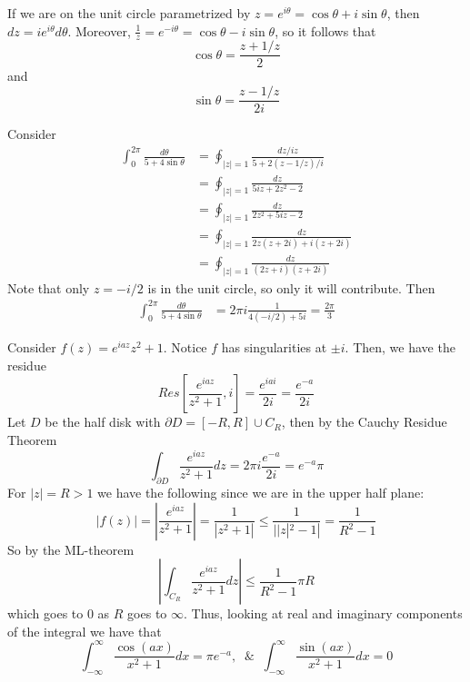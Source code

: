 \documentclass[12pt, a4paper, oneside, openright, titlepage]{book}
\begin{document}
If we are on the unit circle parametrized by $z=e^{i\theta}=\cos\theta + i\sin\theta$, then $dz = ie^{i\theta}d\theta$. Moreover, $\frac{1}{z} = e^{-i\theta} = \cos\theta-i\sin\theta$, so it follows that $$\cos\theta = \frac{z+1/z}{2}$$ and $$\sin\theta = \frac{z-1/z}{2i}$$


\begin{eg}
    Consider \begin{align*}
        \int_0^{2\pi}\frac{d\theta}{5+4\sin\theta} &= \oint_{|z|=1}\frac{dz/iz}{5+2(z-1/z)/i} \\
        &= \oint_{|z| = 1}\frac{dz}{5iz+2z^2-2} \\
        &= \oint_{|z| = 1}\frac{dz}{2z^2+5iz-2} \\
        &= \oint_{|z| =1}\frac{dz}{2z(z+2i)+i(z+2i)} \\
        &= \oint_{|z| = 1}\frac{dz}{(2z+i)(z+2i)}
    \end{align*}
    Note that only $z = -i/2$ is in the unit circle, so only it will contribute. Then \begin{align*}
        \int_0^{2\pi}\frac{d\theta}{5+4\sin\theta} &= 2\pi i\frac{1}{4(-i/2)+5i} = \frac{2\pi}{3}
    \end{align*}
\end{eg}


\begin{eg}
    Consider $f(z) = e^{iaz}{z^2+1}$. Notice $f$ has singularities at $\pm i$. Then, we have the residue \begin{equation*}
        Res\left[\frac{e^{iaz}}{z^2+1},i\right] = \frac{e^{iai}}{2i} = \frac{e^{-a}}{2i}
    \end{equation*}
    Let $D$ be the half disk with $\partial D = [-R,R]\cup C_R$, then by the Cauchy Residue Theorem \begin{equation*}
        \int_{\partial D}\frac{e^{iaz}}{z^2+1}dz = 2\pi i \frac{e^{-a}}{2i} = e^{-a}\pi
    \end{equation*}
    For $|z| = R > 1$ we have the following since we are in the upper half plane: \begin{equation*}
        |f(z)| = \left|\frac{e^{iaz}}{z^2+1}\right| = \frac{1}{|z^2+1|} \leq \frac{1}{||z|^2-1|} = \frac{1}{R^2-1}
    \end{equation*}
    So by the ML-theorem \begin{equation*}
        \left|\int_{C_R}\frac{e^{iaz}}{z^2+1}dz\right| \leq \frac{1}{R^2-1}\pi R
    \end{equation*}
    which goes to $0$ as $R$ goes to $\infty$. Thus, looking at real and imaginary components of the integral we have that \begin{equation*}
        \int_{-\infty}^{\infty}\frac{\cos(ax)}{x^2+1}dx = \pi e^{-a},\;\;\&\;\;\int_{-\infty}^{\infty}\frac{\sin(ax)}{x^2+1}dx = 0
    \end{equation*}
\end{eg}
\end{document}
